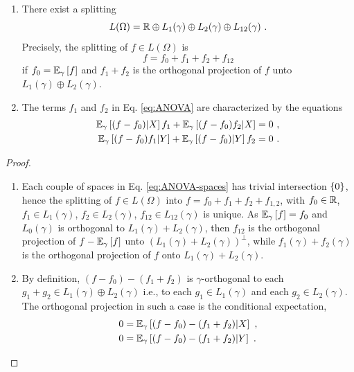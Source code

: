 \documentclass[runningheads]{llncs}
\begin{document}
\begin{proposition}[ANOVA]
\label{prop:ANOVA}
\begin{enumerate}
\item
There exist a splitting
%
\begin{equation*}
%
  L(\Omega) = \reals \oplus L_1(\gamma) \oplus L_2(\gamma) \oplus L_{12}(\gamma) \ . 
\end{equation*}
%
Precisely, the splitting of $f \in L(\Omega)$ is
%
\begin{equation}
 \label{eq:ANOVA}
 f = f_0 + f_1 + f_2 + f_{12}
\end{equation}
%
 if $f_0={\operatorname{\mathbb E}}_{\gamma}\left[f\right]$ and $f_1+f_2$ is the orthogonal projection of $f$ unto $L_1(\gamma) \oplus L_2(\gamma)$.
\item The terms $f_1$ and $f_2$ in Eq. \eqref{eq:ANOVA} are characterized by the equations
%
\begin{equation}
\label{eq:projetion}
  \begin{aligned}
    \condexpectat \gamma {(f - f_0)} X f_1 + \condexpectat \gamma {(f-f_0)f_2} X &= 0 \ , \\
    \condexpectat \gamma {(f - f_0)f_1} Y + \condexpectat \gamma {(f-f_0)} Y f_2 &= 0 \ .
  \end{aligned}
%
\end{equation}
\end{enumerate}
\end{proposition}

\begin{proof}
\begin{enumerate}
\item Each couple of spaces in Eq. \eqref{eq:ANOVA-spaces} has trivial intersection $\left\{ 0 \right\}$, hence the splitting of $f \in L(\Omega)$ into $f = f_0 + f_1 + f_2 + f_{1,2}$, with $f_0 \in \mathbb R$, $f_1 \in L_1(\gamma)$, $f_2 \in L_2(\gamma)$, $f_{12} \in L_{12}(\gamma)$ is unique. As ${\operatorname{\mathbb E}}_{\gamma}\left[f\right] = f_0$ and $L_0(\gamma)$ is orthogonal to $L_1(\gamma)+L_2(\gamma)$, then $f_{12}$ is the orthogonal projection of $f - {\operatorname{\mathbb E}}_{\gamma}\left[f\right]$ unto $(L_1(\gamma)+L_2(\gamma))^\perp$, while $f_1(\gamma)+f_2(\gamma)$ is the orthogonal projection of $f$ onto $L_1(\gamma)+L_2(\gamma)$.
\item By definition, $(f - f_0) - (f_1 + f_2)$ is $\gamma$-orthogonal to each $g_1+g_2 \in L_1(\gamma)\oplus L_2(\gamma)$ i.e., to each $g_1 \in L_1(\gamma)$ and each $g_2 \in L_2(\gamma)$. The orthogonal projection in such a case is the conditional expectation,
%
  \begin{align*}
    0 &= {\operatorname{\mathbb E}}_{\gamma}\left[(f-f_0) - (f_1+f_2) \middle| X\right]  \ , \\
   0 &= {\operatorname{\mathbb E}}_{\gamma}\left[(f-f_0) - (f_1+f_2) \middle| Y\right] \ .
  \end{align*}
\end{enumerate}
\end{proof}
\end{document}
